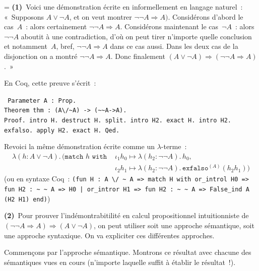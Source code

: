 \documentclass[12pt,a4paper]{article}
\theoremstyle{definition}
\newif\ifcorrige
\newenvironment{corrige}%
{\ifcorrige\relax\else\setbox0=\vbox\bgroup\fi%
\smallbreak\footnotesize\noindent{\underbar{\textit{Corrigé.}}\quad}}
{{\hbox{}\nobreak\hfill\checkmark}%
\ifcorrige\relax\else\egroup\fi\par}
\begin{document}
\begin{corrige}
\textbf{(1)} Voici une démonstration écrite en informellement en
langage naturel : « Supposons $A \lor \neg A$, et on veut montrer
$\neg\neg A \Rightarrow A)$.  Considérons d'abord le cas $A$ : alors
certainement $\neg\neg A \Rightarrow A$.  Considérons maintenant le
cas $\neg A$ : alors $\neg\neg A$ aboutit à une contradiction, d'où on
peut tirer n'importe quelle conclusion et notamment $A$, bref,
$\neg\neg A \Rightarrow A$ dans ce cas aussi.  Dans les deux cas de la
disjonction on a montré $\neg\neg A \Rightarrow A$.  Donc finalement
$(A \lor \neg A) \Rightarrow (\neg\neg A \Rightarrow A)$. »

En Coq, cette preuve s'écrit :

{\tt\noindent
Parameter A : Prop.\\
Theorem thm : (A\textbackslash /\textasciitilde A) -> (\textasciitilde\textasciitilde A->A).\\
Proof.  intro H.  destruct H.  split.  intro H2.  exact H.
intro H2.  exfalso.  apply H2.  exact H.  Qed.
\par}

Revoici la même démonstration écrite comme un $\lambda$-terme :
\[
\begin{aligned}
\lambda(h:A\lor \neg A).\,
(\texttt{match~}h\texttt{~with~}&\iota_1 h_0
\mapsto \lambda(h_2:\neg\neg A).\,h_0,\\
&\iota_2 h_1
\mapsto \lambda(h_2:\neg\neg A).\,\texttt{exfalso}^{(A)}(h_2 h_1))
\end{aligned}
\]
(ou en syntaxe Coq : \texttt{(fun H : A \textbackslash/ \textasciitilde\ A =>
 match H with
  or\_introl H0 => fun H2 : \textasciitilde\ \textasciitilde\ A => H0
| or\_intror H1 => fun H2 : \textasciitilde\ \textasciitilde\ A => False\_ind A (H2 H1)
 end)})

\textbf{(2)} Pour prouver l'indémontrabitilité en calcul
propositionnel intuitionniste de $(\neg\neg A \Rightarrow A)
\Rightarrow (A \lor \neg A)$, on peut utiliser soit une approche
sémantique, soit une approche syntaxique.  On va expliciter ces
différentes approches.

Commençons par l'approche sémantique.  Montrons ce résultat avec
chacune des sémantiques vues en cours (n'importe laquelle suffit à
établir le résultat !).


\end{corrige}
\end{document}
